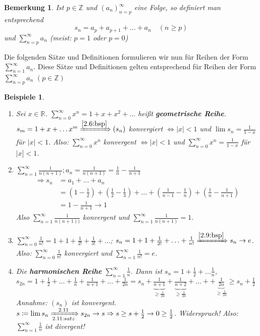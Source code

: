 \documentclass[14pt,titlepage,ngerman,a4paper,headsepline,DIV15,halfparskip*]{scrartcl}
\newcommand{\R}{\mathbb{R}}
\newcommand{\Z}{\mathbb{Z}}
\theoremstyle{named}
\theoremstyle{dotless}
\newtheorem*{beispiele}{Beispiele}
\newtheorem*{bemerkung}{Bemerkung}
\begin{document}
\begin{bemerkung}
	Ist $p \in \Z$ und $(a_{n})_{n=p}^{\infty}$ eine Folge, so definiert man entsprechend
		$$ s_{n} = a_{p} + a_{p+1} + \dotsc + a_{n} \quad (n \geq p) $$
	und $\sum_{n=p}^{\infty} a_{n}$ (meist: $p = 1$ oder $p = 0$)
\end{bemerkung}


Die folgenden Sätze und Definitionen formulieren wir nun für Reihen der Form $\sum_{n=1}^{\infty} a_{n}$. Diese Sätze und Definitionen gelten entsprechend für Reihen der Form $\sum_{n=p}^{\infty} a_{n}$ $(p \in \Z)$

 
\begin{beispiele} ~\
	\begin{enumerate}
		\item Sei $x \in \R$. $\sum_{n=0}^{\infty} x^{n} = 1 + x + x^{2} + \dotsc$ hei{\ss}t \textbf{geometrische Reihe}. \\
			$s_{m} = 1 + x + \dotsc x^{m} \xRightarrow[]{\ref{2.6:bsp}} (s_{n})$ konvergiert $\iff |x| < 1$ und $\lim s_{n} = \frac{1}{1 - x}$ für $|x| < 1$. Also: $\sum_{n=0}^{\infty} x^{n}$ konvergent $\iff |x| < 1$ und $\sum_{n=0}^{\infty} x^{n} = \frac{1}{1 - x}$ für $|x] < 1$.
		\item $\sum_{n=1}^{\infty} \frac{1}{n(n+1)}; a_{n} = \frac{1}{n(n+1)} = \frac{1}{n} - \frac{1}{n+1}$
			\begin{align*}
				\Rightarrow s_{n} & = a_{1} + \dotsc + a_{n} \\
						& = (1 - \frac{1}{2}) + (\frac{1}{2} - \frac{1}{3}) + \dotsc + (\frac{1}{n-1} - \frac{1}{n}) + (\frac{1}{n} - \frac{1}{n+1}) \\
						& = 1 - \frac{1}{n+1} \rightarrow 1
			\end{align*}
			Also $\sum_{n=1}^{\infty} \frac{1}{n(n+1))}$ konvergent und $\sum_{n=1}^{\infty} \frac{1}{n(n+1)} = 1$.
		\item $\sum_{n=0}^{\infty} \frac{1}{n!} = 1 + 1 + \frac{1}{2!} + \frac{1}{3!} + \dotsc$; $s_{n} = 1 + 1 + \frac{1}{2!} + \dotsc + \frac{1}{n!} \xRightarrow[]{\ref{2.9:bsp}} s_{n} \rightarrow e$. \\
			Also: $\sum_{n = 0}^{\infty} \frac{1}{n!}$ konvergiert und $\sum_{n=1}^{\infty} \frac{1}{n!} = e$.
		\item Die \textbf{harmonischen Reihe} $\sum_{n=1}^{\infty} \frac{1}{n}$. Dann ist $s_{n} = 1 + \frac{1}{2} + \dotsc \frac{1}{n}$, \\
			$s_{2n} = 1 + \frac{1}{2} + \dotsc + \frac{1}{n} + \frac{1}{n+1} + \dotsc + \frac{1}{2n} = s_{n} + \underbrace{\frac{1}{n+1}}_{\geq \frac{1}{2n}} + \underbrace{\frac{1}{n+2}}_{\geq \frac{1}{2n}} + \dotsc + + \underbrace{\frac{1}{2n}}_{\geq \frac{1}{2n}} \geq s_{n} + \frac{1}{2}$ \\
			Annahme: $(s_{n})$ ist konvergent. $s \coloneqq \lim s_{n} \xRightarrow[2.11:satz]{2.11} s_{2n} \rightarrow s \Rightarrow s \geq s + \frac{1}{2} \rightarrow 0 \geq \frac{1}{2}$. Widerspruch! Also: $\sum_{n=1}^{\infty} \frac{1}{n}$ ist divergent!
	\end{enumerate}	
\end{beispiele}
\end{document}
